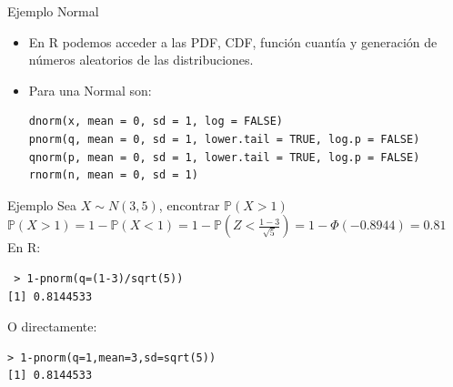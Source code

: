 \documentclass[handout]{beamer}
\begin{document}
\begin{frame}[fragile]{Ejemplo Normal}
\scriptsize{
\begin{itemize}
 \item En R podemos acceder a las PDF, CDF, función cuantía y generación de números aleatorios de las distribuciones.
 \item Para una Normal son:
\begin{verbatim}
dnorm(x, mean = 0, sd = 1, log = FALSE)
pnorm(q, mean = 0, sd = 1, lower.tail = TRUE, log.p = FALSE)
qnorm(p, mean = 0, sd = 1, lower.tail = TRUE, log.p = FALSE)
rnorm(n, mean = 0, sd = 1) 
\end{verbatim}
 
\end{itemize}

\begin{block}{Ejemplo}
Sea $X\sim N(3,5)$, encontrar $\mathbb{P}(X > 1)$ \\
$\mathbb{P}(X >1) = 1-\mathbb{P}(X<1) = 1-\mathbb{P}(Z < \frac{1-3}{\sqrt{5}})=1-\Phi(-0.8944)= 0.81$ \\
En R:
\begin{verbatim}
 > 1-pnorm(q=(1-3)/sqrt(5))
[1] 0.8144533
\end{verbatim}
O directamente:
\begin{verbatim}
> 1-pnorm(q=1,mean=3,sd=sqrt(5))
[1] 0.8144533 
\end{verbatim}
\end{block}
}
\end{frame}
\end{document}
